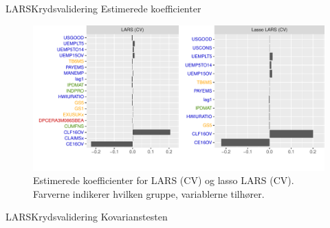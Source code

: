 \begin{frame}{LARS}{Krydsvalidering}
Estimerede koefficienter
\begin{figure}
\includegraphics[width=1\linewidth, height=0.7\textheight]{slides/coef_lars_kryds.pdf}
\caption{Estimerede koefficienter for LARS (CV) og lasso LARS (CV).
Farverne indikerer hvilken gruppe, variablerne tilhører.}
\end{figure}
\end{frame}

\begin{frame}{LARS}{Krydsvalidering}
Kovarianstesten
%
\end{frame}

